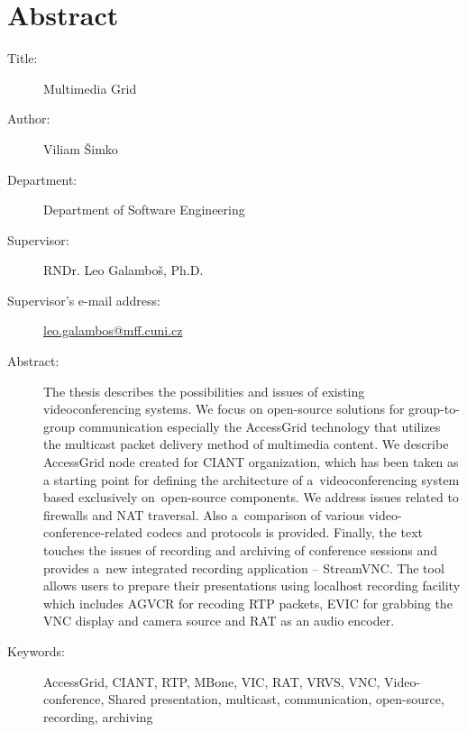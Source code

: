 \chapter*{Abstract}
\begin{description}
\item[Title:] Multimedia Grid
\item[Author:] Viliam Šimko
\item[Department:] Department of Software Engineering
\item[Supervisor:]	RNDr. Leo Galamboš, Ph.D.
\item[Supervisor's e-mail address:] \url{leo.galambos@mff.cuni.cz}

\item[Abstract:]
	The thesis describes the possibilities and issues of existing videoconferencing systems. We focus on open-source solutions for group-to-group communication especially the AccessGrid technology that utilizes the multicast packet delivery method of multimedia content. We describe AccessGrid node created for CIANT organization, which has been taken as a starting point for defining the architecture of a~videoconferencing system based exclusively on~open-source components. We address issues related to firewalls and NAT traversal. Also a~comparison of various video-conference-related codecs and protocols is provided. Finally, the text touches the issues of recording and archiving of conference sessions and provides a~new integrated recording application -- StreamVNC. The tool allows users to prepare their presentations using localhost recording facility which includes AGVCR for recoding RTP packets, EVIC for grabbing the VNC display and camera source and RAT as an audio encoder.

\item[Keywords:]
	AccessGrid, CIANT, RTP, MBone, VIC, RAT, VRVS, VNC, Video-conference, Shared presentation, multicast, communication, open-source, recording, archiving
\end{description}
